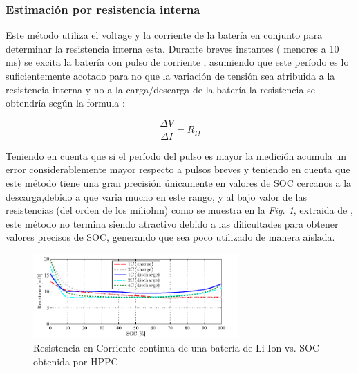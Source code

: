 \documentclass[10pt,a4paper]{article}
\begin{document}
\subsubsection{Estimación por resistencia interna}

Este método utiliza el voltage y la corriente de la batería en conjunto para determinar la resistencia interna esta. Durante breves instantes ( menores a 10 ms) se excita la batería con pulso de corriente , asumiendo que este período es lo suficientemente acotado para no que la variación de tensión sea atribuida a la resistencia interna y no a la carga/descarga de la batería la resistencia se obtendría según la formula :

\begin{figure}[h!]
	\begin{center}
		\begin{equation}
		\frac{\Delta V}{\Delta I} = R_\Omega 
		\label{Internal_resistance_EQ}
		\end{equation}	
	\end{center}
\end{figure}

 Teniendo en cuenta que si el período del pulso es mayor la medición acumula un error considerablemente mayor respecto a pulsos breves y teniendo en cuenta que este método tiene una gran precisión únicamente en valores de SOC cercanos a la descarga,debido a que varia mucho en este rango, y al bajo valor de las resistencias (del orden de los miliohm) como se muestra en la \emph{ Fig. \ref{Internal_resistance}}, extraida de \cite{hentunen2014}, este método no termina siendo atractivo debido a las dificultades para obtener valores precisos de SOC, generando que sea poco utilizado de manera aislada.
 
 \begin{figure}[h!]
 	\begin{center}
 		\includegraphics[width=0.7\textwidth]{Ro_vs_SOC.png}
 		\caption{Resistencia en Corriente continua de una batería de Li-Ion vs. SOC obtenida por HPPC}
 		\label{Internal_resistance}
 	\end{center}
 \end{figure}
 \clearpage
\end{document}
